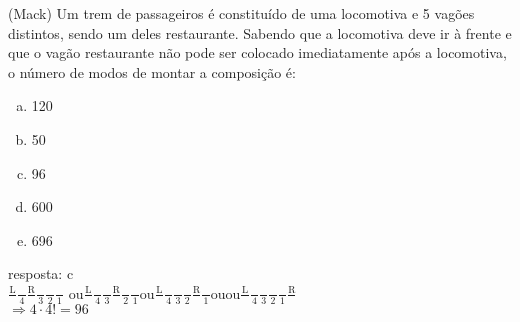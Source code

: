 \begin{ex}
 
(Mack) Um trem de passageiros é constituído de uma locomotiva e 5 vagões distintos, sendo um deles restaurante. Sabendo que a locomotiva deve ir à frente e que o vagão restaurante não pode ser colocado imediatamente após a locomotiva, o número de modos de montar a composição é:
    \begin{enumerate}[(a)]
    \item 120
    \item 50
    \item 96
    \item 600
    \item 696
    \end{enumerate}
      \begin{sol}
        resposta: c \\
        $\frac{\mathrm{L}}{\phantom{A}}\frac{\phantom{A}}{4}\frac{\mathrm{R}}{\phantom{A}}\frac{\phantom{A}}{3}\frac{\phantom{A}}{2}\frac{\phantom{A}}{1}$ \hspace{0.2cm}ou\hspace{0.2cm}$\frac{\mathrm{L}}{\phantom{A}}\frac{\phantom{A}}{4}\frac{\phantom{A}}{3}\frac{\mathrm{R}}{\phantom{A}}\frac{\phantom{A}}{2}\frac{\phantom{A}}{1}$\hspace{0.2cm}ou\hspace{0.2cm}$\frac{\mathrm{L}}{\phantom{A}}\frac{\phantom{A}}{4}\frac{\phantom{A}}{3}\frac{\phantom{A}}{2}\frac{\mathrm{R}}{\phantom{A}}\frac{\phantom{A}}{1}$ou\hspace{0.2cm}ou\hspace{0.2cm}$\frac{\mathrm{L}}{\phantom{A}}\frac{\phantom{A}}{4}\frac{\phantom{A}}{3}\frac{\phantom{A}}{2}\frac{\phantom{A}}{1}\frac{\mathrm{R}}{\phantom{A}}$ \\
        $\Longrightarrow 4\cdot4!=96$
      \end{sol}
\end{ex}